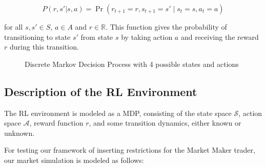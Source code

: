\begin{equation}
	P(r, s' | s, a) = \Pr(r_{t +1} = r, s_{t+1} = s' \mid s_t = s, a_t = a)
\end{equation}

for all \( s, s' \in S \), \( a \in A \) and $r \in \mathbb{R}$. This function gives the probability of transitioning to state \( s' \) from state \( s \) by taking action \( a \) and receiving the reward $r$ during this transition.

\begin{figure}[H]
	\centering
	
	\caption{Discrete Markov Decision Process with 4 possible states and actions}
	\label{fig:mdp}
\end{figure}

\subsection{Description of the RL Environment}
The RL environment is modeled as a MDP, consisting of the state space \( \mathcal{S} \), action space \( \mathcal{A} \), reward function \( r \), and some transition dynamics, either known or unknown. 

For testing our framework of inserting restrictions for the Market Maker trader, our market simulation is modeled as follows:

